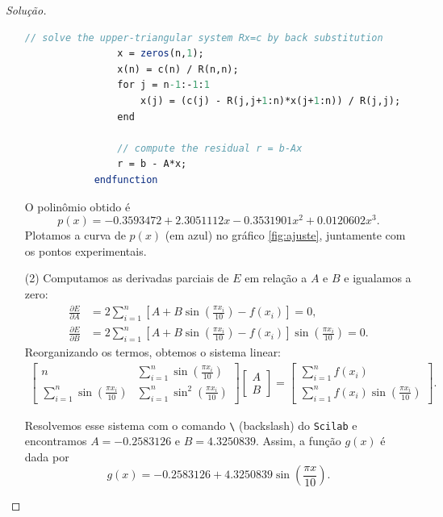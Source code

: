\documentclass{article}
\begin{document}
\begin{proof}[Solução]
\begin{itemize}
\begin{lstlisting}[language=Scilab, caption=Resolução do problema de mínimos quadrados usando decomposição QR]
                // solve the upper-triangular system Rx=c by back substitution
                x = zeros(n,1);
                x(n) = c(n) / R(n,n);
                for j = n-1:-1:1
                    x(j) = (c(j) - R(j,j+1:n)*x(j+1:n)) / R(j,j);
                end
                
                // compute the residual r = b-Ax
                r = b - A*x;
            endfunction
        \end{lstlisting}

        O polinômio obtido é 
        \[
            p(x) = -0.3593472 +2.3051112x -0.3531901x^2 +0.0120602x^3.
        \] Plotamos a curva de \(p(x)\) (em azul) no gráfico \ref{fig:ajuste}, juntamente com os pontos experimentais.
        \item [(2)] Computamos as derivadas parciais de \(E\) em relação a \(A\) e \(B\) e igualamos a zero:
        \begin{align*}
            \frac{\partial E}{\partial A} &= 2 \sum_{i=1}^{n} \left[ A + B \sin\left(\frac{\pi x_i}{10}\right) - f(x_i) \right] = 0, \\
            \frac{\partial E}{\partial B} &= 2 \sum_{i=1}^{n} \left[ A + B \sin\left(\frac{\pi x_i}{10}\right) - f(x_i) \right] \sin\left(\frac{\pi x_i}{10}\right) = 0.
        \end{align*} Reorganizando os termos, obtemos o sistema linear:
        \begin{align*}
            \begin{bmatrix}
                n & \displaystyle\sum_{i=1}^{n} \sin\left(\frac{\pi x_i}{10}\right) \\
                \displaystyle\sum_{i=1}^{n} \sin\left(\frac{\pi x_i}{10}\right) & \displaystyle\sum_{i=1}^{n} \sin^2\left(\frac{\pi x_i}{10}\right)
            \end{bmatrix} \begin{bmatrix}
                A \\
                B
            \end{bmatrix} = \begin{bmatrix}
                \displaystyle\sum_{i=1}^{n} f(x_i) \\
                \displaystyle\sum_{i=1}^{n} f(x_i) \sin\left(\frac{\pi x_i}{10}\right)
            \end{bmatrix}.
        \end{align*}

        Resolvemos esse sistema com o comando \texttt{\textbackslash} (backslash) do \texttt{Scilab} e encontramos \(A = -0.2583126\) e \(B = 4.3250839\). Assim, a função \(g(x)\) é dada por
        \begin{equation}
            g(x) = -0.2583126 + 4.3250839 \sin\left(\frac{\pi x}{10}\right).
        \end{equation}


\end{itemize}
\end{proof}
\end{document}

